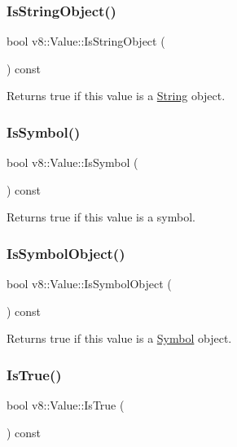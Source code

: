 \subsubsection{\texorpdfstring{Is\+String\+Object()}{IsStringObject()}}
{\footnotesize\ttfamily bool v8\+::\+Value\+::\+Is\+String\+Object (\begin{DoxyParamCaption}{ }\end{DoxyParamCaption}) const}

Returns true if this value is a \mbox{\hyperlink{classv8_1_1String}{String}} object. \mbox{\label{classv8_1_1Value_a0fee90dc2589b156d277a74b0b225a71}} 
\subsubsection{\texorpdfstring{Is\+Symbol()}{IsSymbol()}}
{\footnotesize\ttfamily bool v8\+::\+Value\+::\+Is\+Symbol (\begin{DoxyParamCaption}{ }\end{DoxyParamCaption}) const}

Returns true if this value is a symbol. \mbox{\label{classv8_1_1Value_a1d5507f09734f8062a0d0a9a78496b2a}} 
\subsubsection{\texorpdfstring{Is\+Symbol\+Object()}{IsSymbolObject()}}
{\footnotesize\ttfamily bool v8\+::\+Value\+::\+Is\+Symbol\+Object (\begin{DoxyParamCaption}{ }\end{DoxyParamCaption}) const}

Returns true if this value is a \mbox{\hyperlink{classv8_1_1Symbol}{Symbol}} object. \mbox{\label{classv8_1_1Value_a48c300598bad0155eb59965c9e6b86b6}} 
\subsubsection{\texorpdfstring{Is\+True()}{IsTrue()}}
{\footnotesize\ttfamily bool v8\+::\+Value\+::\+Is\+True (\begin{DoxyParamCaption}{ }\end{DoxyParamCaption}) const}

